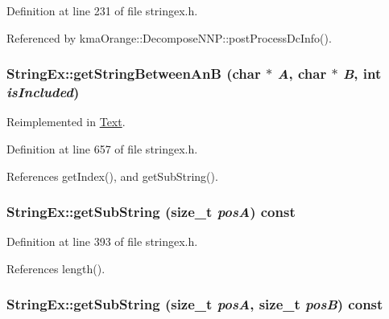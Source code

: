 Definition at line 231 of file stringex.h.

Referenced by kmaOrange::DecomposeNNP::postProcessDcInfo().\hypertarget{classStringEx_76f316d1d3db65232f5ad8224ab3db9c}{
\subsubsection[{getStringBetweenAnB}]{ StringEx::getStringBetweenAnB (char $\ast$ {\em A}, \/  char $\ast$ {\em B}, \/  int {\em isIncluded})}}
\label{classStringEx_76f316d1d3db65232f5ad8224ab3db9c}




Reimplemented in \hyperlink{classText_b23de14f2e2378e8c3c6c73d9ae28eef}{Text}.

Definition at line 657 of file stringex.h.

References getIndex(), and getSubString().\hypertarget{classStringEx_8f2103c0eb6908f4d17e7aa5f8501887}{
\subsubsection[{getSubString}]{ StringEx::getSubString (size\_\-t {\em posA}) const}}
\label{classStringEx_8f2103c0eb6908f4d17e7aa5f8501887}




Definition at line 393 of file stringex.h.

References length().\hypertarget{classStringEx_bd2c36be4fbacd796cd43ecc5ea0de57}{
\subsubsection[{getSubString}]{ StringEx::getSubString (size\_\-t {\em posA}, \/  size\_\-t {\em posB}) const}}
\label{classStringEx_bd2c36be4fbacd796cd43ecc5ea0de57}




